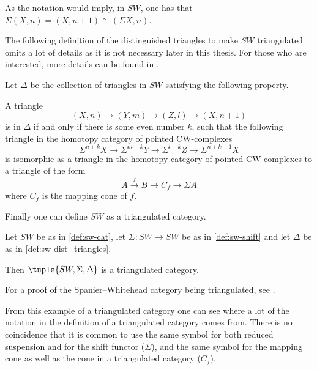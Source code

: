 As the notation would imply, in \( SW \), one has that \( \Sigma(X, n) = (X, n + 1) \cong ( \Sigma X, n ) \).

The following definition of the distinguished triangles to make \( SW \) triangulated omits a lot of details as it is not necessary later in this thesis. For those who are interested, more details can be found in \cite[Definition 5.8, Definition 4.7]{Daria_Bachelor}.

\begin{definition}
    \label{def:sw-dist_triangles}
    Let \( \Delta \) be the collection of triangles in \( SW \) satisfying the following property.

    A triangle
    \[
        (X, n) \to (Y, m) \to (Z, l) \to (X, n + 1)
    \]
    is in \( \Delta \) if and only if there is some even number \( k \), such that the following triangle in the homotopy category of pointed CW-complexes
    \[
        \Sigma^{n + k} X \to \Sigma^{m + k} Y \to \Sigma^{l + k} Z \to \Sigma^{n + k + 1} X
    \]
    is isomorphic as a triangle in the homotopy category of pointed CW-complexes to a triangle of the form
    \[
        A \stackrel{f}{\to} B \to C_f \to \Sigma A
    \]
    where \( C_f \) is the mapping cone of \( f \).
\end{definition}

Finally one can define \( SW \) as a triangulated category.

\begin{example}
    Let \( SW \) be as in \autoref{def:sw-cat}, let \( \Sigma: SW \to SW \) be as in \autoref{def:sw-shift} and let \( \Delta \) be as in \autoref{def:sw-dist_triangles}.

    Then \( \tuple{SW, \Sigma, \Delta} \) is a triangulated category.
\end{example}

For a proof of the Spanier--Whitehead category being triangulated, see \cite[Theorem 5.9]{Daria_Bachelor}.

From this example of a triangulated category one can see where a lot of the notation in the definition of a triangulated category comes from. There is no coincidence that it is common to use the same symbol for both reduced suspension and for the shift functor (\( \Sigma \)), and the same symbol for the mapping cone as well as the cone in a triangulated category (\( C_f \)).
